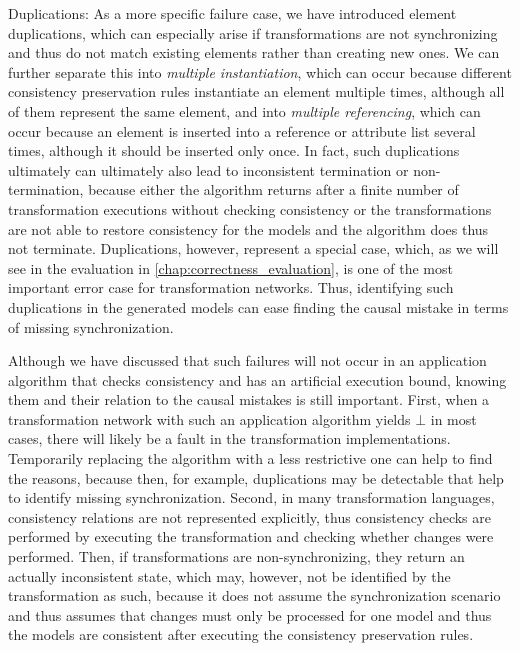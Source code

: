 \begin{properdescription}
    \item[Duplications:] 
    As a more specific failure case, we have introduced element duplications, which can especially arise if transformations are not synchronizing and thus do not match existing elements rather than creating new ones.
    We can further separate this into \emph{multiple instantiation}, which can occur because different consistency preservation rules instantiate an element multiple times, although all of them represent the same element, and into \emph{multiple referencing}, which can occur because an element is inserted into a reference or attribute list several times, although it should be inserted only once. 
    In fact, such duplications ultimately can ultimately also lead to inconsistent termination or non-termination, because either the algorithm returns after a finite number of transformation executions without checking consistency or the transformations are not able to restore consistency for the models and the algorithm does thus not terminate.
    Duplications, however, represent a special case, which, as we will see in the evaluation in \autoref{chap:correctness_evaluation}, is one of the most important error case for transformation networks.
    Thus, identifying such duplications in the generated models can ease finding the causal mistake in terms of missing synchronization.
\end{properdescription}

Although we have discussed that such failures will not occur in an application algorithm that checks consistency and has an artificial execution bound, knowing them and their relation to the causal mistakes is still important.
First, when a transformation network with such an application algorithm yields $\bot$ in most cases, there will likely be a fault in the transformation implementations.
Temporarily replacing the algorithm with a less restrictive one can help to find the reasons, because then, for example, duplications may be detectable that help to identify missing synchronization.
Second, in many transformation languages, consistency relations are not represented explicitly, thus consistency checks are performed by executing the transformation and checking whether changes were performed.
Then, if transformations are non-synchronizing, they return an actually inconsistent state, which may, however, not be identified by the transformation as such, because it does not assume the synchronization scenario and thus assumes that changes must only be processed for one model and thus the models are consistent after executing the consistency preservation rules.

